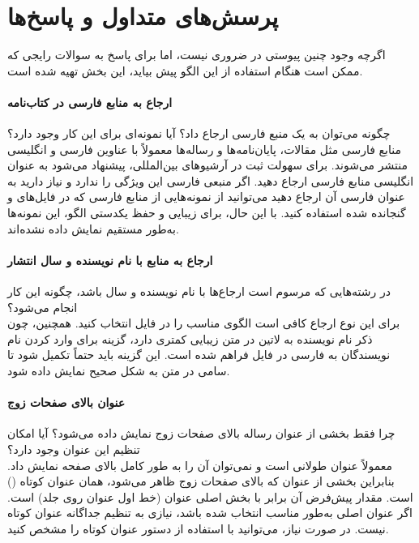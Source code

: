 \chapter{پرسش‌های متداول و پاسخ‌ها}
اگرچه وجود چنین پیوستی در 
\thesis 
ضروری نیست، اما برای پاسخ به سوالات رایجی که ممکن است هنگام استفاده از این الگو پیش بیاید، این بخش تهیه شده است.


\subsubsection{ارجاع به منابع فارسی در کتاب‌نامه}
چگونه می‌توان به یک منبع فارسی ارجاع داد؟ آیا نمونه‌ای برای این کار وجود دارد؟\\
منابع فارسی مثل مقالات، پایان‌نامه‌ها و رساله‌ها معمولاً با عناوین فارسی و انگلیسی منتشر می‌شوند. برای سهولت ثبت در آرشیوهای بین‌المللی، پیشنهاد می‌شود به عنوان انگلیسی منابع فارسی ارجاع دهید. اگر منبعی فارسی این ویژگی را ندارد و نیاز دارید به عنوان فارسی آن ارجاع دهید می‌توانید از نمونه‌هایی از منابع فارسی که در فایل‌های 
و 
گنجانده شده استفاده کنید. با این حال، برای زیبایی و حفظ یکدستی الگو، این نمونه‌ها به‌طور مستقیم نمایش داده نشده‌اند.


\subsubsection{ارجاع به منابع با نام نویسنده و سال انتشار}
در رشته‌هایی که مرسوم است ارجاع‌ها با نام نویسنده و سال باشد، چگونه این کار انجام می‌شود؟\\
برای این نوع ارجاع کافی است الگوی مناسب را در فایل 
انتخاب کنید. همچنین، چون ذکر نام نویسنده به لاتین در متن زیبایی کمتری دارد، گزینه 
برای وارد کردن نام نویسندگان به فارسی در فایل 
فراهم شده است. این گزینه باید حتماً تکمیل شود تا سامی در متن به شکل صحیح نمایش داده شود.


\subsubsection{عنوان بالای صفحات زوج}
چرا فقط بخشی از عنوان رساله بالای صفحات زوج نمایش داده می‌شود؟ آیا امکان تنظیم این عنوان وجود دارد؟\\
معمولاً عنوان 
\thesis 
طولانی است و نمی‌توان آن را به طور کامل بالای صفحه نمایش داد. بنابراین بخشی از عنوان که بالای صفحات زوج ظاهر می‌شود، همان عنوان کوتاه () است. مقدار پیش‌فرض آن برابر با بخش اصلی عنوان (خط اول عنوان روی جلد) است. اگر عنوان اصلی به‌طور مناسب انتخاب شده باشد، نیازی به تنظیم جداگانه عنوان کوتاه نیست. در صورت نیاز، می‌توانید با استفاده از دستور
عنوان کوتاه را مشخص کنید.


